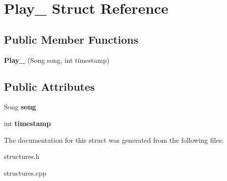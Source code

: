 \hypertarget{struct_play__}{}\section{Play\+\_\+ Struct Reference}
\label{struct_play__}
\subsection*{Public Member Functions}
\begin{DoxyCompactItemize}
\item 
{\bfseries Play\+\_\+} (Song song, int timestamp)\hypertarget{struct_play___a249db3a1ac125aab220ecd109defacc4}{}\label{struct_play___a249db3a1ac125aab220ecd109defacc4}

\end{DoxyCompactItemize}
\subsection*{Public Attributes}
\begin{DoxyCompactItemize}
\item 
Song {\bfseries song}\hypertarget{struct_play___ad288ab8e059a9040e192a00809d7eec4}{}\label{struct_play___ad288ab8e059a9040e192a00809d7eec4}

\item 
int {\bfseries timestamp}\hypertarget{struct_play___a632aa2c9a3ed162e06711577b68bdc3a}{}\label{struct_play___a632aa2c9a3ed162e06711577b68bdc3a}

\end{DoxyCompactItemize}


The documentation for this struct was generated from the following files\+:\begin{DoxyCompactItemize}
\item 
structures.\+h\item 
structures.\+cpp\end{DoxyCompactItemize}
